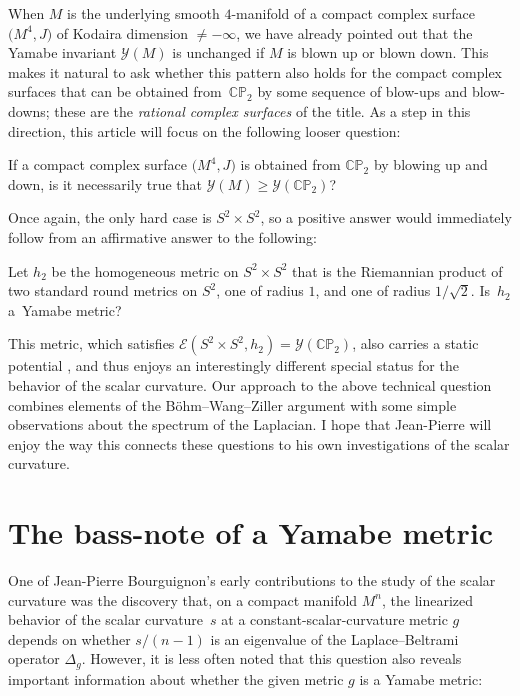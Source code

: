\documentclass[10pt,a4paper]{amsart}
\numberwithin{equation}{section}
\def\CP{\mathbb{CP}}
\begin{document}
When $M$ is the underlying smooth $4$-manifold of a compact complex surface $\big(M^4, J\big)$ of Kodaira dimension $\neq -\infty$,
we have already pointed out that
the Yamabe invariant $\mathscr{Y}(M)$ is
unchanged if $M$ is blown up or blown down. This makes it natural to ask whether this pattern
also holds for the compact complex surfaces that can be obtained from~$\CP_2$ by some
 sequence of blow-ups and blow-downs; these are the
{\em rational complex surfaces} of the title. As a step in this direction, this article will focus
 on the following looser question:

\begin{question} If a compact complex surface $\big(M^4, J\big)$ is obtained from $\CP_2$ by blowing up and down, is it necessarily true that $\mathscr{Y}(M)\geq \mathscr{Y}(\CP_2)$?
\end{question}

Once again, the only hard case is $S^2 \times S^2$, so
a positive answer would immediately follow from an affirmative answer to the following:

\begin{question2} Let $h_2$ be the homogeneous metric on $S^2 \times S^2$ that is the Riemannian product of two standard round metrics on $S^2$, one of radius $1$,
and one of radius $1/\sqrt{2}$. Is~$h_2$ a~Yamabe metric?
\end{question2}

This metric, which satisfies $\mathscr{E}(S^2\times S^2, h_2) = \mathscr{Y} (\CP_2)$, also carries a static potential \cite{ambrozio,corvino,lafontaine},
and thus enjoys an interestingly different special status for the behavior of the scalar curvature.
 Our approach to the above technical question combines elements of the B\"ohm--Wang--Ziller argument with some simple observations about the spectrum of the
 Laplacian. I hope that Jean-Pierre will enjoy the way this connects these questions to his own investigations of the scalar curvature.

\section{The bass-note of a Yamabe metric}

One of Jean-Pierre Bourguignon's early contributions \cite{bes,bourguignon} to the study of the scalar curvature
was the discovery that, on a compact manifold $M^n$, the linearized behavior of the scalar curvature~$s$ at a constant-scalar-curvature
metric $g$ depends on whether $s/(n-1)$
is an eigenvalue of the Laplace--Beltrami operator $\Delta_g$. However, it is less often noted
 that this question also reveals important information about whether the given metric $g$ is a Yamabe metric:
\end{document}
